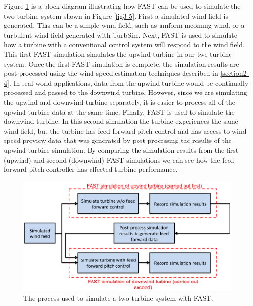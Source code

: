 Figure \ref{fig3-6} is a block diagram illustrating how FAST can be used to simulate the two turbine system shown in Figure \ref{fig3-5}. First a simulated wind field is generated. This can be a simple wind field, such as  uniform incoming wind, or a turbulent wind field generated with TurbSim. Next, FAST is used to simulate how a turbine with a conventional control system will respond to the  wind field. This first FAST simulation simulates the upwind turbine in our two turbine system. Once the first FAST simulation is complete, the simulation results are post-processed using the wind speed estimation techniques described in \ref{section2-4}. In real world applications, data from the upwind turbine would be continually processed and passed to the downwind turbine. However, since we are simulating the upwind and downwind turbine separately, it is easier to process all of the upwind turbine data at the same time. Finally, FAST is used to simulate the downwind turbine. In this second simulation the turbine experiences the same wind field, but the turbine has feed forward pitch control and has access to wind speed preview data that was generated by post processing the results of the upwind turbine simulation. By comparing the simulation results from the first (upwind) and second (downwind) FAST simulations we can see how the feed forward pitch controller has affected turbine performance.

 \begin{figure}[htbp]
	\centering
		\includegraphics[width=\linewidth]{Figures/ch3Figures/fig3-6.png}
		
	\caption{The process used to simulate a two turbine system with FAST.}
	\label{fig3-6}
\end{figure}



